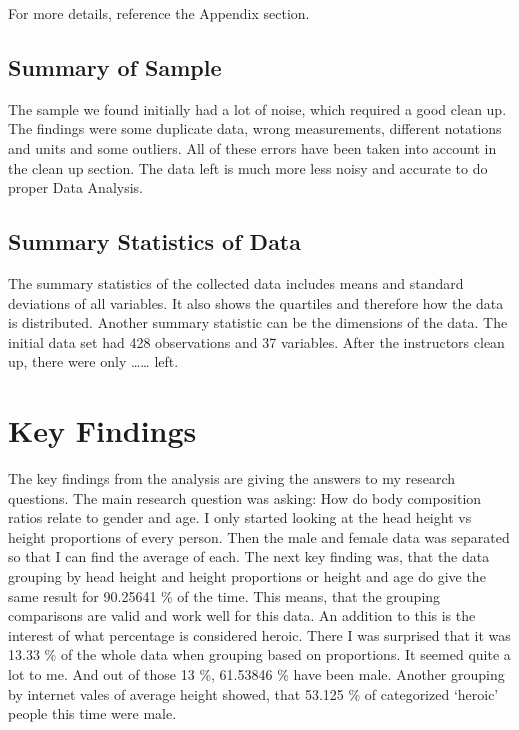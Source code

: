 \documentclass[]{article}
\begin{document}
For more details, reference the Appendix section.

\subsection{Summary of Sample}
\label{sec:data-sample}

The sample we found initially had a lot of noise, which required a good
clean up. The findings were some duplicate data, wrong measurements,
different notations and units and some outliers. All of these errors
have been taken into account in the clean up section. The data left is
much more less noisy and accurate to do proper Data Analysis.

\subsection{Summary Statistics of Data}
\label{sec:data-summary}

The summary statistics of the collected data includes means and standard
deviations of all variables. It also shows the quartiles and therefore
how the data is distributed. Another summary statistic can be the
dimensions of the data. The initial data set had 428 observations and 37
variables. After the instructors clean up, there were only
\ldots\ldots{} left.

\section{Key Findings}
\label{sec:findings}

The key findings from the analysis are giving the answers to my research
questions. The main research question was asking: How do body
composition ratios relate to gender and age. I only started looking at
the head height vs height proportions of every person. Then the male and
female data was separated so that I can find the average of each. The
next key finding was, that the data grouping by head height and height
proportions or height and age do give the same result for 90.25641 \% of
the time. This means, that the grouping comparisons are valid and work
well for this data. An addition to this is the interest of what
percentage is considered heroic. There I was surprised that it was 13.33
\% of the whole data when grouping based on proportions. It seemed quite
a lot to me. And out of those 13 \%, 61.53846 \% have been male. Another
grouping by internet vales of average height showed, that 53.125 \% of
categorized `heroic' people this time were male.
\end{document}
